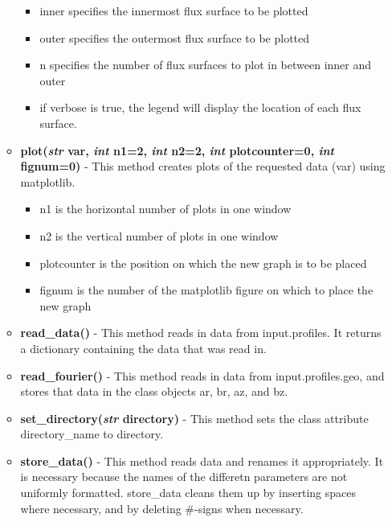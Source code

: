 \documentclass{article}
\begin{document}
\begin{itemize}
\begin{itemize}
\begin{itemize}
\item inner specifies the innermost flux surface to be plotted
\item outer specifies the outermost flux surface to be plotted
\item n specifies the number of flux surfaces to plot in between inner and outer
\item if verbose is true, the legend will display the location of each flux surface.
\end{itemize}
\item \textbf{plot(\emph{str} var, \emph{int} n1=2, \emph{int} n2=2, \emph{int} plotcounter=0, \emph{int} fignum=0)} - This method creates plots of the requested data (var) using matplotlib.
\begin{itemize}
\item n1 is the horizontal number of plots in one window
\item n2 is the vertical number of plots in one window
\item plotcounter is the position on which the new graph is to be placed
\item fignum is the number of the matplotlib figure on which to place the new graph
\end{itemize}
\item \textbf{read\_data()} - This method reads in data from input.profiles.  It returns a dictionary containing the data that was read in.
\item \textbf{read\_fourier()} - This method reads in data from input.profiles.geo, and stores that data in the class objects ar, br, az, and bz.
\item \textbf{set\_directory(\emph{str} directory)} - This method sets the class attribute directory\_name to directory.
\item \textbf{store\_data()} - This method reads data and renames it appropriately.  It is necessary because the names of the differetn parameters are not uniformly formatted.  store\_data cleans them up by inserting spaces where necessary, and by deleting \#-signs when necessary.
\end{itemize}
\end{itemize}

\newpage
\end{document}
